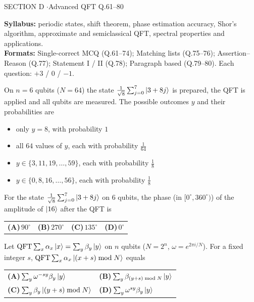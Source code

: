 \documentclass[11pt,a4paper]{article}
\newcommand{\optlabel}[1]{\textbf{(#1)}}
\newenvironment{qitem}[1]{\begin{list}{}{\setlength{\leftmargin}{3.3em}\setlength{\labelwidth}{3.1em}%
  \setlength{\labelsep}{0.2em}\setlength{\topsep}{3pt}\setlength{\parsep}{3pt}}\item[\textbf{Q.#1}\hfill]}{\end{list}}
\newcommand{\qsep}{\par\vspace{2pt}{\color{black!15}\hrule}\vspace{4pt}}
\begin{document}
\newpage

\begin{sectionbanner}SECTION D \enspace$\cdot$\enspace Advanced QFT \hfill Q.61--80\end{sectionbanner}

{\small \textbf{Syllabus:} periodic states, shift theorem, phase estimation accuracy, Shor's algorithm, approximate and semiclassical QFT, spectral properties and applications.\\ \textbf{Formats:} Single-correct MCQ (Q.61--74); Matching lists (Q.75--76); Assertion--Reason (Q.77); Statement I / II (Q.78); Paragraph based (Q.79--80). Each question: $+3$ / $0$ / $-1$.}
\par\medskip

\begin{qitem}{61}
On $n = 6$ qubits ($N = 64$) the state $\frac{1}{\sqrt8}\sum_{j=0}^{7}\ket{3 + 8j}$ is prepared, the QFT is applied and all
qubits are measured. The possible outcomes $y$ and their probabilities are
\begin{itemize}[leftmargin=2.6em, labelsep=0.4em, itemsep=2pt, topsep=3pt]
\item[\optlabel{A}] only $y = 8$, with probability $1$
\item[\optlabel{B}] all $64$ values of $y$, each with probability $\frac{1}{64}$
\item[\optlabel{C}] $y \in \{3, 11, 19, \dots, 59\}$, each with probability $\frac18$
\item[\optlabel{D}] $y \in \{0, 8, 16, \dots, 56\}$, each with probability $\frac18$
\end{itemize}
\end{qitem}
\qsep

\begin{qitem}{62}
For the state $\frac{1}{\sqrt8}\sum_{j=0}^{7}\ket{3 + 8j}$ on $6$ qubits, the phase (in $[0^\circ, 360^\circ)$) of the amplitude of
$\ket{16}$ after the QFT is
\par\smallskip\noindent\begin{tabularx}{\linewidth}{@{}*{4}{L}@{}}
\optlabel{A}\,$90^\circ$ & \optlabel{B}\,$270^\circ$ & \optlabel{C}\,$135^\circ$ & \optlabel{D}\,$0^\circ$
\end{tabularx}
\end{qitem}
\qsep

\begin{qitem}{63}
Let $\mathrm{QFT}\sum_x\alpha_x\ket{x} = \sum_y\beta_y\ket{y}$ on $n$ qubits ($N = 2^n$, $\omega = e^{2\pi i/N}$). For a fixed integer $s$,
$\mathrm{QFT}\sum_x\alpha_x\ket{(x + s) \bmod N}$ equals
\par\smallskip\noindent\begin{tabularx}{\linewidth}{@{}*{2}{L}@{}}
\optlabel{A}\,$\sum_y\omega^{-sy}\beta_y\ket{y}$ & \optlabel{B}\,$\sum_y\beta_{(y+s)\bmod N}\ket{y}$ \\[3pt]
\optlabel{C}\,$\sum_y\beta_y\ket{(y + s)\bmod N}$ & \optlabel{D}\,$\sum_y\omega^{sy}\beta_y\ket{y}$
\end{tabularx}
\end{qitem}
\qsep
\end{document}
